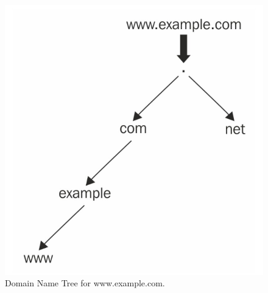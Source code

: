     	\begin{figure}[h!]
    	    \includegraphics[width=\textwidth]{latex/figures/domain_name_tree.jpg}
    	    \caption[Domain Name Tree for www.example.com.]{Domain Name Tree for www.example.com. \cite{jeftovic_managing_2018}}
    	    \label{fig:dns_tree}
        \end{figure}

